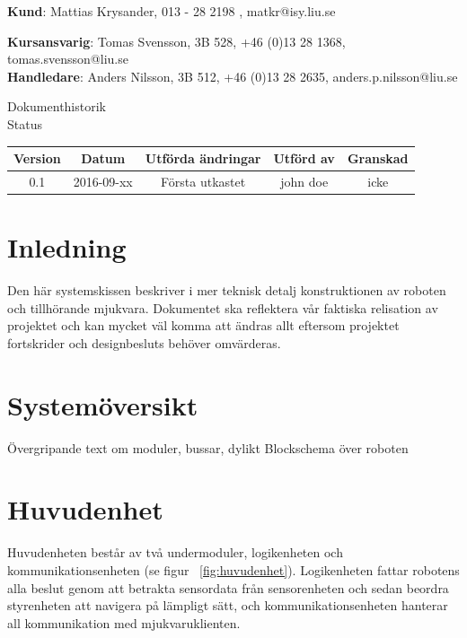 \documentclass{article}
\begin{document}
\begin{center}
\textbf{Kund}: Mattias Krysander, 013 - 28 2198 , matkr@isy.liu.se
\end{center}

\begin{center}
\textbf{Kursansvarig}: Tomas Svensson, 3B 528, +46 (0)13 28 1368, tomas.svensson@liu.se \\
\textbf{Handledare}: Anders Nilsson, 3B 512, +46 (0)13 28 2635, anders.p.nilsson@liu.se
\end{center}
\vspace*{\fill}
\clearpage

\renewcommand*\contentsname{Innehållsförteckning}
\tableofcontents
\clearpage


{
\sffamily
\centering
\large


{\huge 
Dokumenthistorik \\
}
Status
\begin{center}
\begin{tabular}{ | c | c | c | c | c |} 
\hline
\textbf{Version} & \textbf{Datum} & \textbf{Utförda ändringar} & \textbf{Utförd av } & \textbf{Granskad} \\  
\hline
0.1 & 2016-09-xx & Första utkastet &  john doe & icke \\
\hline
\end{tabular}
\end{center}
}

\clearpage


\section{Inledning}
Den här systemskissen beskriver i mer teknisk detalj konstruktionen av roboten och tillhörande mjukvara. Dokumentet ska reflektera vår faktiska relisation av projektet och kan mycket väl komma att ändras allt eftersom projektet fortskrider och designbesluts behöver omvärderas.

\section{Systemöversikt}
Övergripande text om moduler, bussar, dylikt
Blockschema över roboten

\section{Huvudenhet}

Huvudenheten består av två undermoduler, logikenheten och kommunikationsenheten (se figur ~\ref{fig:huvudenhet}). Logikenheten fattar robotens alla beslut genom att betrakta sensordata från sensorenheten och sedan beordra styrenheten att navigera på lämpligt sätt, och kommunikationsenheten hanterar all kommunikation med mjukvaruklienten. 
\end{document}
